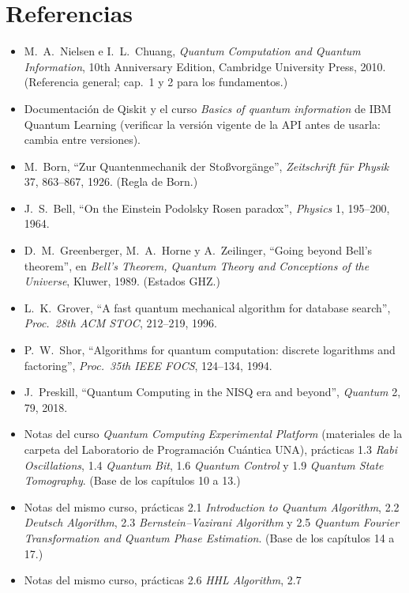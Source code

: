 \ifdefined\enmain\else
  \def\tituloconcepto{Referencias}
  
\fi
\section*{Referencias}
\begin{itemize}
  \item M.~A.~Nielsen e I.~L.~Chuang, \emph{Quantum Computation and Quantum
    Information}, 10th Anniversary Edition, Cambridge University Press, 2010.
    (Referencia general; cap.~1 y 2 para los fundamentos.)
  \item Documentación de Qiskit y el curso \emph{Basics of quantum information}
    de IBM Quantum Learning (verificar la versión vigente de la API antes de
    usarla: cambia entre versiones).
  \item M.~Born, ``Zur Quantenmechanik der Stoßvorgänge'', \emph{Zeitschrift
    für Physik} 37, 863--867, 1926. (Regla de Born.)
  \item J.~S.~Bell, ``On the Einstein Podolsky Rosen paradox'',
    \emph{Physics} 1, 195--200, 1964.
  \item D.~M.~Greenberger, M.~A.~Horne y A.~Zeilinger, ``Going beyond Bell's
    theorem'', en \emph{Bell's Theorem, Quantum Theory and Conceptions of the
    Universe}, Kluwer, 1989. (Estados GHZ.)
  \item L.~K.~Grover, ``A fast quantum mechanical algorithm for database
    search'', \emph{Proc.\ 28th ACM STOC}, 212--219, 1996.
  \item P.~W.~Shor, ``Algorithms for quantum computation: discrete logarithms
    and factoring'', \emph{Proc.\ 35th IEEE FOCS}, 124--134, 1994.
  \item J.~Preskill, ``Quantum Computing in the NISQ era and beyond'',
    \emph{Quantum} 2, 79, 2018.
  \item Notas del curso \emph{Quantum Computing Experimental Platform}
    (materiales de la carpeta del Laboratorio de Programación Cuántica UNA),
    prácticas 1.3 \emph{Rabi Oscillations}, 1.4 \emph{Quantum Bit},
    1.6 \emph{Quantum Control} y 1.9 \emph{Quantum State Tomography}.
    (Base de los capítulos 10 a 13.)
  \item Notas del mismo curso, prácticas 2.1 \emph{Introduction to Quantum
    Algorithm}, 2.2 \emph{Deutsch Algorithm}, 2.3 \emph{Bernstein--Vazirani
    Algorithm} y 2.5 \emph{Quantum Fourier Transformation and Quantum Phase
    Estimation}. (Base de los capítulos 14 a 17.)
  \item Notas del mismo curso, prácticas 2.6 \emph{HHL Algorithm}, 2.7

\end{itemize}
